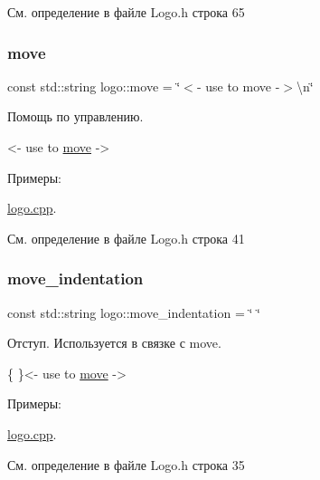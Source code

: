 См. определение в файле Logo.\+h строка 65

\mbox{\label{namespacelogo_a03b6b80b5648e7dbbbf00b258df733b6}} 
\subsubsection{\texorpdfstring{move}{move}}
{\footnotesize\ttfamily const std\+::string logo\+::move = \char`\"{}$<$-\/ use to move -\/$>$\textbackslash{}n\char`\"{}}

Помощь по управлению. 
\begin{DoxyCode}
<- use to \hyperlink{namespacelogo_a03b6b80b5648e7dbbbf00b258df733b6}{move} ->
\end{DoxyCode}
 \begin{Desc}
\item[Примеры\+: ]\par
\hyperlink{logo_8cpp-example}{logo.\+cpp}.\end{Desc}


См. определение в файле Logo.\+h строка 41

\mbox{\label{namespacelogo_a7570bf74bf945a06ced26f6fccaeab53}} 
\subsubsection{\texorpdfstring{move\+\_\+indentation}{move\_indentation}}
{\footnotesize\ttfamily const std\+::string logo\+::move\+\_\+indentation = \char`\"{} \char`\"{}}

Отступ. Используется в связке с move. 
\begin{DoxyCode}
\{       \}<- use to \hyperlink{namespacelogo_a03b6b80b5648e7dbbbf00b258df733b6}{move} ->
\end{DoxyCode}
 \begin{Desc}
\item[Примеры\+: ]\par
\hyperlink{logo_8cpp-example}{logo.\+cpp}.\end{Desc}


См. определение в файле Logo.\+h строка 35

\mbox{\label{namespacelogo_abbbdbfbbcae50e2017f3ed1bdf0e1fa3}} 
